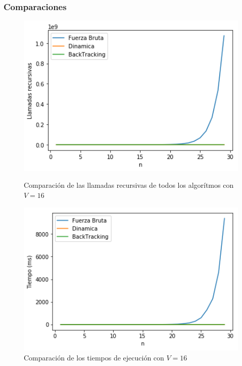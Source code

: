\subsubsection{Comparaciones}
\begin{figure}[H] 
    \centering
    \begin{minipage}{0.45\textwidth}
        \centering
        \includegraphics[width=1\textwidth]{img/llamadas/v/todosLlamadasvChico.png} %
        \caption{Comparaci\'on de las llamadas recursivas de todos los algor\'itmos con $V = 16$}
        \label{fig:comparaTodosLlamadas}
    \end{minipage}\hfill
    \begin{minipage}{0.45\textwidth}
        \centering
        \includegraphics[width=1\textwidth]{img/tiempo/v/todosTiempo.png} %
        \caption{Comparaci\'on de los tiempos de ejecuci\'on con $V = 16$}
        \label{fig:comparaTodosTiempo}
    \end{minipage}\hfill
\end{figure}
